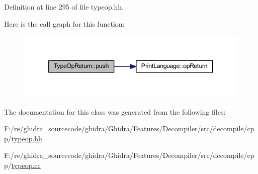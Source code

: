 Definition at line 295 of file typeop.\+hh.

Here is the call graph for this function\+:
\nopagebreak
\begin{figure}[H]
\begin{center}
\leavevmode
\includegraphics[width=346pt]{class_type_op_return_a8a11b331d3a293b7dbe4bce287313abf_cgraph}
\end{center}
\end{figure}


The documentation for this class was generated from the following files\+:\begin{DoxyCompactItemize}
\item 
F\+:/re/ghidra\+\_\+sourcecode/ghidra/\+Ghidra/\+Features/\+Decompiler/src/decompile/cpp/\mbox{\hyperlink{typeop_8hh}{typeop.\+hh}}\item 
F\+:/re/ghidra\+\_\+sourcecode/ghidra/\+Ghidra/\+Features/\+Decompiler/src/decompile/cpp/\mbox{\hyperlink{typeop_8cc}{typeop.\+cc}}\end{DoxyCompactItemize}
